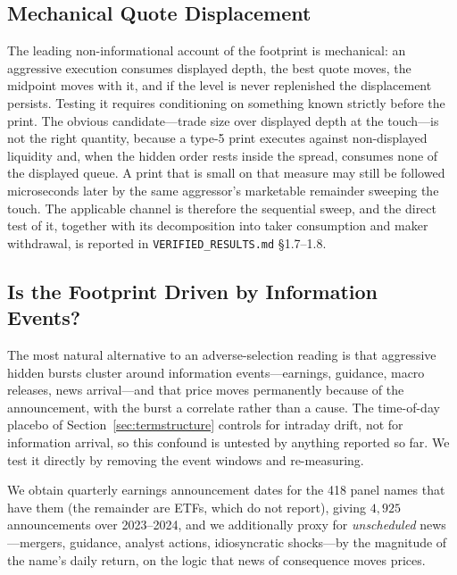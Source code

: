 \documentclass[11pt]{article}
\begin{document}
\subsection{Mechanical Quote Displacement}
\label{sub:depletion}
The leading non-informational account of the footprint is mechanical: an aggressive execution
consumes displayed depth, the best quote moves, the midpoint moves with it, and if the level
is never replenished the displacement persists. Testing it requires conditioning on something
known strictly before the print. The obvious candidate---trade size over displayed depth at
the touch---is not the right quantity, because a type-5 print executes against non-displayed
liquidity and, when the hidden order rests inside the spread, consumes none of the displayed
queue. A print that is small on that measure may still be followed microseconds later by the
same aggressor's marketable remainder sweeping the touch. The applicable channel is therefore
the sequential sweep, and the direct test of it, together with its decomposition into taker
consumption and maker withdrawal, is reported in \texttt{VERIFIED\_RESULTS.md} \S1.7--1.8.

\subsection{Is the Footprint Driven by Information Events?}
\label{sub:news}

The most natural alternative to an adverse-selection reading is that aggressive hidden
bursts cluster around information events---earnings, guidance, macro releases, news
arrival---and that price moves permanently because of the announcement, with the burst a
correlate rather than a cause. The time-of-day placebo of Section~\ref{sec:termstructure}
controls for intraday drift, not for information arrival, so this confound is untested by
anything reported so far. We test it directly by removing the event windows and
re-measuring.

We obtain quarterly earnings announcement dates for the 418 panel names that have them
(the remainder are ETFs, which do not report), giving $4{,}925$ announcements over
2023--2024, and we additionally proxy for \emph{unscheduled} news---mergers, guidance,
analyst actions, idiosyncratic shocks---by the magnitude of the name's daily return, on the
logic that news of consequence moves prices.
\end{document}
